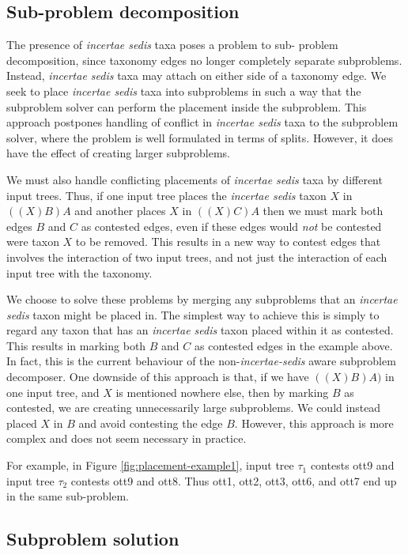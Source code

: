 \documentclass[english]{article}
\begin{document}
\subsection{Sub-problem decomposition}

The presence of \emph{incertae sedis }taxa poses a problem to sub-
problem decomposition, since taxonomy edges no longer completely
separate subproblems.
Instead, \emph{incertae sedis} taxa may attach
on either side of a taxonomy edge.
We seek to place \emph{incertae
sedis} taxa into subproblems in such a way that the subproblem solver
can perform the placement inside the subproblem.
This approach
postpones handling of conflict in \emph{incertae sedis} taxa to the
subproblem solver, where the problem is well formulated in terms of
splits.
However, it does have the effect of creating larger
subproblems.

We must also handle conflicting placements of \emph{incertae sedis}
taxa by different input trees.
Thus, if one input tree places the
\emph{incertae sedis} taxon $X$ in $((X)B)A$ and another places $X$ in
$((X)C)A$ then we must mark both edges $B$ and $C$ as contested edges,
even if these edges would \emph{not} be contested were taxon $X$ to be
removed.
This results in a new way to contest edges that involves the
interaction of two input trees, and not just the interaction of each
input tree with the taxonomy.

We choose to solve these problems by merging any subproblems that an
\emph{incertae sedis} taxon might be placed in.
The simplest way to
achieve this is simply to regard any taxon that has an \emph{incertae
sedis }taxon placed within it as contested.
This results in marking
both $B$ and $C$ as contested edges in the example above.
In fact,
this is the current behaviour of the non-\emph{incertae-sedis} aware
subproblem decomposer.
One downside of this approach is that, if we
have $((X)B)A)$ in one input tree, and $X$ is mentioned nowhere else,
then by marking $B$ as contested, we are creating unnecessarily large
subproblems.
We could instead placed $X$ in $B$ and avoid contesting
the edge $B$.
However, this approach is more complex and does not seem
necessary in practice.


 For example, in Figure
\ref{fig:placement-example1}, input tree $\tau_{1}$ contests ott9 and
input tree $\tau_{2}$ contests ott9 and ott8.
Thus ott1, ott2, ott3,
ott6, and ott7 end up in the same sub-problem.

\subsection{Subproblem solution}
\end{document}
